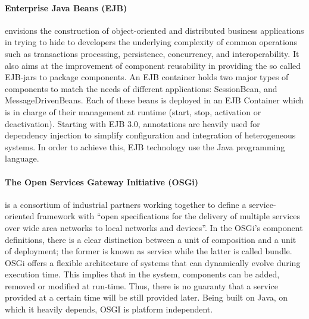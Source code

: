 \paragraph{Enterprise Java Beans (EJB)} \cite{OracleEJB3.0} envisions the construction of object-oriented and
distributed business applications in trying to hide to developers the underlying complexity of common operations such as transactions processing, persistence,
concurrency, and interoperability.
It also aims at the improvement of component reusability in providing the so called EJB-jars to package components.
An EJB container holds two major types of components to match the needs of different applications: SessionBean, and MessageDrivenBeans.
Each of these beans is deployed in an EJB Container which is in charge of their management at
runtime (start, stop, activation or deactivation).
Starting with EJB 3.0, annotations are heavily used for dependency injection to simplify configuration and integration of heterogeneous systems. 
In order to achieve this, EJB technology use the Java programming language.

\paragraph{The Open Services Gateway Initiative (OSGi)} \cite{OSGI:r5} is a consortium of industrial partners working together to
define a service-oriented framework with ``open specifications
for the delivery of multiple services over wide area networks to local networks and devices''.
In the OSGi's component definitions, there is a clear distinction between a unit of
composition and a unit of deployment; the former is known as service while the latter is called bundle.
OSGi offers a flexible architecture of systems that can dynamically evolve during execution time.
This implies that in the system, components can be added, removed or modified at run-time.
Thus, there is no guaranty that a service provided at a certain time will be still provided later.
Being built on Java, on which it heavily depends, OSGI is platform independent.



